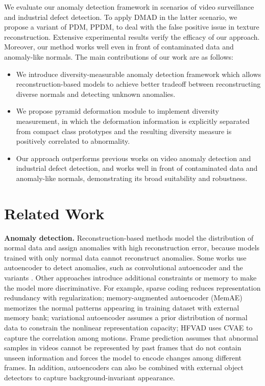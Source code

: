 \documentclass[10pt,twocolumn,letterpaper]{article}
\begin{document}
We evaluate our anomaly detection framework in scenarios of video surveillance and industrial defect detection. To apply DMAD in the latter scenario, we propose a variant of PDM, PPDM, to deal with the false positive issue in texture reconstruction. Extensive experimental results verify the efficacy of our approach. Moreover, our method works well even in front of contaminated data and anomaly-like normals. The main contributions of our work are as follows:
\begin{itemize}[leftmargin= 1 em, topsep= 2.pt, parsep= 0pt, itemsep=2.pt, partopsep=0pt]
    \item
    We introduce diversity-measurable anomaly detection framework which allows reconstruction-based models to achieve better tradeoff between reconstructing diverse normals and detecting unknown anomalies.
    \item
    We propose pyramid deformation module to implement diversity measurement, in which the deformation information is explicitly separated from compact class prototypes and the resulting diversity measure is positively correlated to abnormality.
    \item
    Our approach outperforms previous works on video anomaly detection and industrial defect detection, and works well in front of contaminated data and anomaly-like normals, demonstrating its broad suitability and robustness.
\end{itemize}

\section{Related Work}
    \textbf{Anomaly detection.}
    Reconstruction-based methods model the distribution of normal data and assign anomalies with high reconstruction error, because models trained with only normal data cannot reconstruct anomalies. Some works use autoencoder to detect anomalies, such as convolutional autoencoder \cite{convae2d} and the variants \cite{convae3d,convaelstm}. Other approaches introduce additional constraints or memory to make the model more discriminative. For example, sparse coding \cite{onlinesparsecode,timesparse} reduces representation redundancy with regularization; memory-augmented autoencoder (MemAE) \cite{memae} memorizes the normal patterns appearing in training dataset with external memory bank; variational autoencoder \cite{betavae,vqvae} assumes a prior distribution of normal data to constrain the nonlinear representation capacity; HFVAD \cite{hf2vad} uses CVAE \cite{cvae} to capture the correlation among motions. Frame prediction \cite{framepred} assumes that abnormal samples in videos cannot be represented by past frames that do not contain unseen information and forces the model to encode changes among different frames. In addition, autoencoders can also be combined with external object detectors \cite{hf2vad,ssml,ocae} to capture background-invariant appearance.
\end{document}
